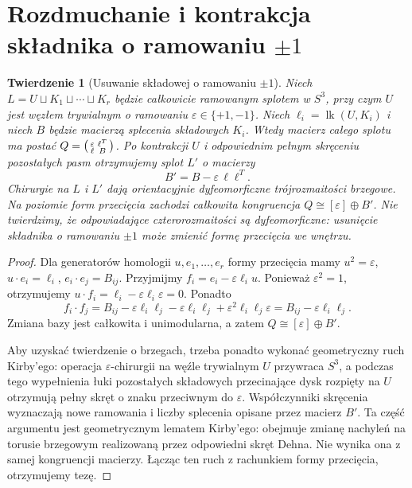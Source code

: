 \documentclass[11pt,a4paper]{report}
\numberwithin{equation}{section}
\theoremstyle{plain}
\newtheorem{twierdzenie}{Twierdzenie}[section]
\theoremstyle{definition}
\theoremstyle{remark}
\begin{document}
\section{Rozdmuchanie i kontrakcja składnika o ramowaniu \texorpdfstring{$\pm1$}{+/-1}}
\label{sec:tg-kirby-blowdown}

\begin{twierdzenie}[Usuwanie składowej o ramowaniu $\pm1$]
\label{thm:tg-kirby-blowdown}
Niech $L=U\sqcup K_1\sqcup\cdots\sqcup K_r$
będzie całkowicie ramowanym splotem w $S^3$,
przy czym $U$ jest węzłem trywialnym o ramowaniu
$\varepsilon\in\{+1,-1\}$.
Niech $\ell_i=\operatorname{lk}(U,K_i)$ i niech
$B$ będzie macierzą splecenia składowych $K_i$.
Wtedy macierz całego splotu ma postać
$Q=\begin{psmallmatrix}\varepsilon&\ell^T\\\ell&B\end{psmallmatrix}$.
Po kontrakcji $U$ i odpowiednim pełnym skręceniu
pozostałych pasm otrzymujemy splot $L'$ o macierzy
\[
B'=B-\varepsilon\,\ell\ell^T.
\]
Chirurgie na $L$ i $L'$ dają orientacyjnie dyfeomorficzne
trójrozmaitości brzegowe. Na poziomie form przecięcia
zachodzi całkowita kongruencja
$Q\cong[\varepsilon]\oplus B'$.
Nie twierdzimy, że odpowiadające czterorozmaitości
są dyfeomorficzne: usunięcie składnika o ramowaniu
$\pm1$ może zmienić formę przecięcia we wnętrzu.
\end{twierdzenie}

\begin{proof}
Dla generatorów homologii $u,e_1,\ldots,e_r$
formy przecięcia mamy $u^2=\varepsilon$,
$u\cdot e_i=\ell_i$, $e_i\cdot e_j=B_{ij}$.
Przyjmijmy
$f_i=e_i-\varepsilon\ell_i u$. Ponieważ
$\varepsilon^2=1$, otrzymujemy
$u\cdot f_i=\ell_i-\varepsilon\ell_i\varepsilon=0$.
Ponadto
\[
f_i\cdot f_j=B_{ij}
-\varepsilon\ell_i\ell_j
-\varepsilon\ell_i\ell_j
+\varepsilon^2\ell_i\ell_j\varepsilon
=B_{ij}-\varepsilon\ell_i\ell_j.
\]
Zmiana bazy jest całkowita i unimodularna,
a zatem $Q\cong[\varepsilon]\oplus B'$.

Aby uzyskać twierdzenie o brzegach, trzeba ponadto
wykonać geometryczny ruch Kirby'ego: operacja
$\varepsilon$-chirurgii na węźle trywialnym $U$
przywraca $S^3$, a podczas tego wypełnienia łuki
pozostałych składowych przecinające dysk rozpięty na $U$
otrzymują pełny skręt o znaku przeciwnym do $\varepsilon$.
Współczynniki skręcenia wyznaczają nowe ramowania
i liczby splecenia opisane przez macierz $B'$.
Ta część argumentu jest geometrycznym lematem Kirby'ego:
obejmuje zmianę nachyleń na torusie brzegowym
realizowaną przez odpowiedni skręt Dehna.
Nie wynika ona z samej kongruencji macierzy.
Łącząc ten ruch z rachunkiem formy przecięcia,
otrzymujemy tezę.
\end{proof}
\end{document}
